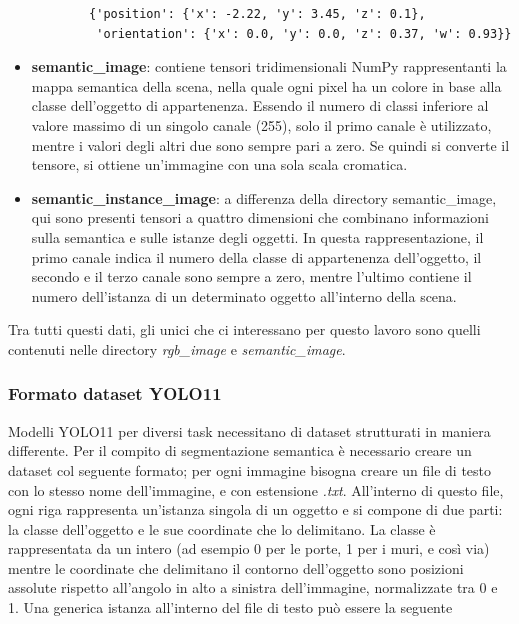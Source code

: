 \documentclass[12pt]{report}
\begin{document}
\begin{itemize}
	\begin{verbatim}
		{'position': {'x': -2.22, 'y': 3.45, 'z': 0.1},
		 'orientation': {'x': 0.0, 'y': 0.0, 'z': 0.37, 'w': 0.93}}
	\end{verbatim}
	
	\item \textbf{semantic\_image}: contiene tensori tridimensionali NumPy rappresentanti la mappa semantica della scena, nella quale ogni pixel ha un colore in base alla classe dell'oggetto di appartenenza. Essendo il numero di classi inferiore al valore massimo di un singolo canale (255), solo il primo canale è utilizzato, mentre i valori degli altri due sono sempre pari a zero. Se quindi si converte il tensore, si ottiene un'immagine con una sola scala cromatica.
	
	\item \textbf{semantic\_instance\_image}: a differenza della directory semantic\_image, qui sono presenti tensori a quattro dimensioni che combinano informazioni sulla semantica e sulle istanze degli oggetti. In questa rappresentazione, il primo canale indica il numero della classe di appartenenza dell'oggetto, il secondo e il terzo canale sono sempre a zero, mentre l'ultimo contiene il numero dell'istanza di un determinato oggetto all'interno della scena.
\end{itemize}

Tra tutti questi dati, gli unici che ci interessano per questo lavoro sono quelli contenuti nelle directory \textit{rgb\_image} e \textit{semantic\_image}.

\subsubsection{Formato dataset YOLO11}
\label{sec:formato_dataset_yolo11}

Modelli YOLO11 per diversi task necessitano di dataset strutturati in maniera differente. Per il compito di segmentazione semantica è necessario creare un dataset col seguente formato; per ogni immagine bisogna creare un file di testo con lo stesso nome dell'immagine, e con estensione \textit{.txt}. All'interno di questo file, ogni riga rappresenta un'istanza singola di un oggetto e si compone di due parti: la classe dell'oggetto e le sue coordinate che lo delimitano. La classe è rappresentata da un intero (ad esempio 0 per le porte, 1 per i muri, e così via) mentre le coordinate che delimitano il contorno dell'oggetto sono posizioni assolute rispetto all'angolo in alto a sinistra dell'immagine, normalizzate tra 0 e 1. Una generica istanza all'interno del file di testo può essere la seguente
\end{document}
